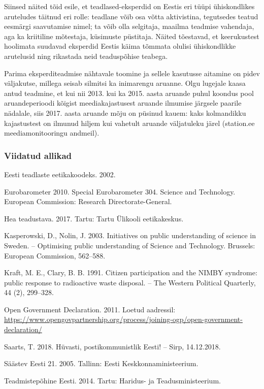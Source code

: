 \documentclass[estonian,]{article}
\begin{document}
Siinsed näited tõid esile, et teadlased-eksperdid on Eestis eri tüüpi ühiskondlikes aruteludes täitnud eri rolle: teadlane võib osa võtta aktivistina, tegutsedes teatud eesmärgi saavutamise nimel; ta võib olla selgitaja, maailma teadmise vahendaja, aga ka kriitiline mõtestaja, küsimuste püstitaja. Näited tõestavad, et keerukustest hoolimata suudavad eksperdid Eestis käima tõmmata olulisi ühiskondlikke arutelusid ning rikastada neid teaduspõhise teabega.

Parima eksperditeadmise nähtavale toomine ja sellele kasutusse aitamine on pidev väljakutse, millega seisab silmitsi ka inimarengu aruanne. Olgu lugejale kaasa antud teadmine, et kui nii 2013. kui ka 2015. aasta aruande puhul koondus pool aruandeperioodi kõigist meediakajastusest aruande ilmumise järgsele paarile nädalale, siis 2017. aasta aruande mõju on püsinud kauem: kaks kolmandikku kajastustest on ilmunud hiljem kui vahetult aruande väljatuleku järel (station.ee meediamonitooringu andmeil).

\hypertarget{viidatud-allikad-20}{%
\subsubsection*{Viidatud allikad}\label{viidatud-allikad-20}}

Eesti teadlaste eetikakoodeks. 2002.

Eurobarometer 2010. Special Eurobarometer 304. Science and Technology. European Commission: Research Directorate-General.

Hea teadustava. 2017. Tartu: Tartu Ülikooli eetikakeskus.

Kasperowski, D., Nolin, J. 2003. Initiatives on public understanding of science in Sweden. -- Optimising public understanding of Science and Technology. Brussels: European Commission, 562--588.

Kraft, M. E., Clary, B. B. 1991. Citizen participation and the NIMBY syndrome: public response to radioactive waste disposal. -- The Western Political Quarterly, 44 (2), 299--328.

Open Government Declaration. 2011. Loetud aadressil: \url{https://www.opengovpartnership.org/process/joining-ogp/open-government-declaration/}

Saarts, T. 2018. Hüvasti, postikommunistlik Eesti! -- Sirp, 14.12.2018.

Säästev Eesti 21. 2005. Tallinn: Eesti Keskkonnaministeerium.

Teadmistepõhine Eesti. 2014. Tartu: Haridus- ja Teadusministeerium.
\end{document}
